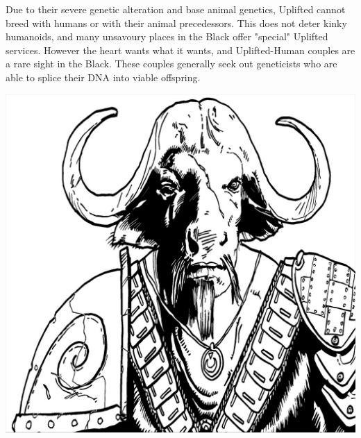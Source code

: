 \documentclass[10pt,twoside]{article}
\begin{document}
\begin{multicols}{2}
  Due to their severe genetic alteration and base animal genetics, Uplifted cannot breed with humans or with their animal precedessors. This does not deter kinky humanoids, and many unsavoury places in the Black offer "special" Uplifted services. However the heart wants what it wants, and Uplifted-Human couples are a rare sight in the Black. These couples generally seek out geneticists who are able to splice their DNA into viable offspring.
  
  \includegraphics[width=\linewidth]{TCP-Armored-6}
  

\end{multicols}
\end{document}
